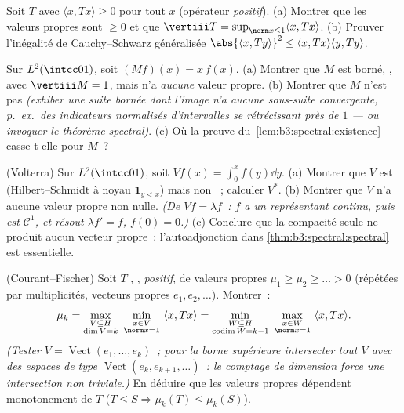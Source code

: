 \begin{exercise}[$\star\star$]\label{exo:b3:spectral:5}
Soit $T$  avec $\langle x, Tx\rangle \geq 0$ pour
tout $x$ (opérateur \emph{positif}).
(a) Montrer que les valeurs propres sont $\geq 0$ et que
$\vertiii T = \sup_{\norm x\leq1}\langle x, Tx\rangle$.
(b) Prouver l'inégalité de Cauchy--Schwarz généralisée
$\abs{\langle x, Ty\rangle}^2 \leq \langle x, Tx\rangle\langle
y, Ty\rangle$.
\end{exercise}

\begin{exercise}[$\star\star$]\label{exo:b3:spectral:6}
Sur $L^2(\intcc01)$, soit $(Mf)(x) = x\,f(x)$.
(a) Montrer que $M$ est borné, , avec $\vertiii M =
1$, mais n'a \emph{aucune} valeur propre.
(b) Montrer que $M$ n'est pas  \emph{(exhiber une suite
bornée dont l'image n'a aucune sous-suite convergente, p.\
ex.\ des indicateurs normalisés d'intervalles se rétrécissant
près de $1$ --- ou invoquer le théorème spectral)}.
(c) Où la preuve du~\cref{lem:b3:spectral:existence} casse-t-elle
pour $M$~?
\end{exercise}

\begin{exercise}[$\star\star$]\label{exo:b3:spectral:7}
(Volterra) Sur $L^2(\intcc01)$, soit $Vf(x) = \int_0^xf(y)\dd
y$.
(a) Montrer que $V$ est  (Hilbert--Schmidt à noyau
$\mathbf 1_{y < x}$) mais non \omterm{def:b3:spectral:selfadjoint}{autoadjoint}~; calculer $V^*$.
(b) Montrer que $V$ n'a aucune valeur propre non nulle.
\emph{(De $Vf = \lambda f$~: $f$ a un représentant continu,
puis est $\mathcal C^1$, et résout $\lambda f' = f$, $f(0) =
0$.)}
(c) Conclure que la compacité seule ne produit aucun vecteur
propre~: l'autoadjonction dans
\cref{thm:b3:spectral:spectral} est essentielle.
\end{exercise}

\begin{exercise}[$\star\star\star$]\label{exo:b3:spectral:8}
(Courant--Fischer) Soit $T$ , ,
\emph{positif}, de valeurs propres $\mu_1 \geq \mu_2 \geq
\dots > 0$ (répétées par multiplicités, vecteurs propres
$e_1, e_2, \dots$). Montrer~:
\[
\mu_{k} = \max_{\substack{V \subseteq H \\ \dim V = k}}\
\min_{\substack{x \in V\\ \norm x = 1}}\ \langle x, Tx\rangle
= \min_{\substack{W \subseteq H\\ \operatorname{codim}W =
k-1}}\ \max_{\substack{x\in W\\ \norm x = 1}}\ \langle x,
Tx\rangle .
\]
\emph{(Tester $V = \operatorname{Vect}(e_1,\dots,e_k)$~; pour
la borne supérieure intersecter tout $V$ avec des espaces de
type $\operatorname{Vect}(e_k, e_{k+1}, \dots)$~: le
comptage de dimension force une intersection non triviale.)}
En déduire que les valeurs propres dépendent monotonement de
$T$ ($T \leq S \Rightarrow \mu_k(T) \leq \mu_k(S)$).
\end{exercise}

